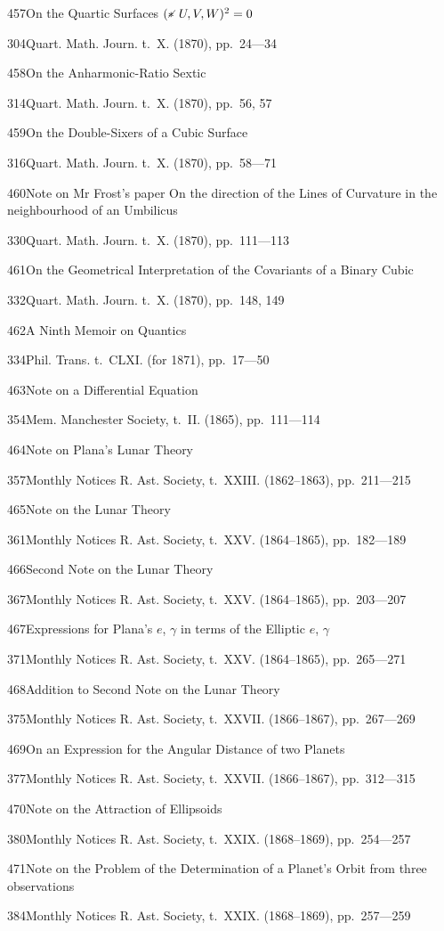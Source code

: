 \documentclass[11pt,a4paper]{book}
\providecommand{\tocentry}[2]{#1\dotfill #2\par}
\begin{document}
\tocentry{457}{On the Quartic Surfaces $(* \!\!\! \raisebox{0.3ex}{\scriptsize$\diagup$} \, U, V, W)^2 = 0$}{304}{Quart. Math. Journ. t.~X. (1870), pp.~24---34}

\tocentry{458}{On the Anharmonic-Ratio Sextic}{314}{Quart. Math. Journ. t.~X. (1870), pp.~56, 57}

\newpage

\tocentry{459}{On the Double-Sixers of a Cubic Surface}{316}{Quart. Math. Journ. t.~X. (1870), pp.~58---71}

\tocentry{460}{Note on Mr Frost's paper On the direction of the Lines of Curvature in the neighbourhood of an Umbilicus}{330}{Quart. Math. Journ. t.~X. (1870), pp.~111---113}

\tocentry{461}{On the Geometrical Interpretation of the Covariants of a Binary Cubic}{332}{Quart. Math. Journ. t.~X. (1870), pp.~148, 149}

\tocentry{462}{A Ninth Memoir on Quantics}{334}{Phil. Trans. t.~CLXI. (for 1871), pp.~17---50}

\tocentry{463}{Note on a Differential Equation}{354}{Mem. Manchester Society, t.~II. (1865), pp.~111---114}

\tocentry{464}{Note on Plana's Lunar Theory}{357}{Monthly Notices R. Ast. Society, t.~XXIII. (1862--1863), pp.~211---215}

\tocentry{465}{Note on the Lunar Theory}{361}{Monthly Notices R. Ast. Society, t.~XXV. (1864--1865), pp.~182---189}

\tocentry{466}{Second Note on the Lunar Theory}{367}{Monthly Notices R. Ast. Society, t.~XXV. (1864--1865), pp.~203---207}

\tocentry{467}{Expressions for Plana's $e$, $\gamma$ in terms of the Elliptic $e$, $\gamma$}{371}{Monthly Notices R. Ast. Society, t.~XXV. (1864--1865), pp.~265---271}

\tocentry{468}{Addition to Second Note on the Lunar Theory}{375}{Monthly Notices R. Ast. Society, t.~XXVII. (1866--1867), pp.~267---269}

\tocentry{469}{On an Expression for the Angular Distance of two Planets}{377}{Monthly Notices R. Ast. Society, t.~XXVII. (1866--1867), pp.~312---315}

\tocentry{470}{Note on the Attraction of Ellipsoids}{380}{Monthly Notices R. Ast. Society, t.~XXIX. (1868--1869), pp.~254---257}

\tocentry{471}{Note on the Problem of the Determination of a Planet's Orbit from three observations}{384}{Monthly Notices R. Ast. Society, t.~XXIX. (1868--1869), pp.~257---259}
\end{document}

